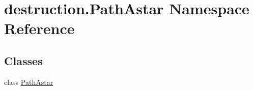 \hypertarget{namespacedestruction_1_1_path_astar}{\section{destruction.\-Path\-Astar Namespace Reference}
\label{namespacedestruction_1_1_path_astar}
}
\subsection*{Classes}
\begin{DoxyCompactItemize}
\item 
class \hyperlink{classdestruction_1_1_path_astar_1_1_path_astar}{Path\-Astar}
\end{DoxyCompactItemize}
